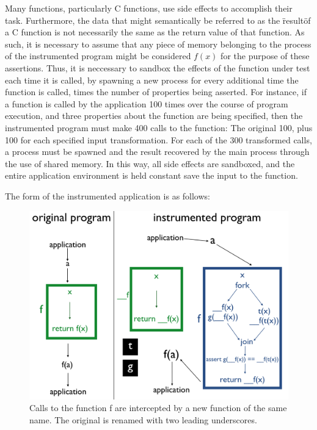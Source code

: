 \documentclass[notitlepage]{article}
\begin{document}
Many functions, particularly C functions, use side effects to accomplish their task. Furthermore, the data that might semantically be referred to as the \"result\" of a C function is not necessarily the same as the return value of that function. As such, it is necessary to assume that any piece of memory belonging to the process of the instrumented program might be considered $f(x)$ for the purpose of these assertions. Thus, it is neccessary to sandbox the effects of the function under test each time it is called, by spawning a new process for every additional time the function is called, times the number of properties being asserted. For instance, if a function is called by the application 100 times over the course of program execution, and three properties about the function are being specified, then the instrumented program must make 400 calls to the function: The original 100, plus 100 for each specified input transformation. For each of the 300 transformed calls, a process must be spawned and the result recovered by the main process through the use of shared memory. In this way, all side effects are sandboxed, and the entire application environment is held constant save the input to the function.

The form of the instrumented application is as follows:

\begin{figure}[ht!]
\centering
\includegraphics[width=175mm]{calico_pic2.png}
\caption{Calls to the function f are intercepted by a new function of the same name. The original is renamed with two leading underscores.}
\end{figure}
\end{document}
